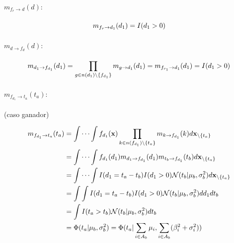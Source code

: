 \documentclass[11pt,twoside,spanish]{report} %
\begin{document}
\paragraph{$m_{f_{r}\rightarrow d}(d):$}

\begin{equation}
	\centering
	m_{f_{r}\rightarrow d_1}(d_1) = I(d_1>0)
\end{equation}

\paragraph{$m_{d\rightarrow f_{d}}(d):$}

\begin{equation}
	\centering
	m_{d_1\rightarrow f_{d_1}}(d_1) = \prod_{g\in n(d_1)\backslash\{f_{d_1}\}} m_{g\rightarrow d_1}(d_1)
	= m_{f_{r_1}\rightarrow d_1}(d_1)
	=  I(d_1>0)
\end{equation}

\paragraph{$m_{f_{d_1}\rightarrow t_a}(t_a):$} (caso ganador)

\begin{equation}
	\centering
	\begin{split}
		m_{f_{d_1}\rightarrow t_a}(t_a) & = \int\cdots\int f_{d_1}(\textbf{x})\prod_{k\in n(f_{d_1})\backslash\{t_a\}} m_{k\rightarrow f_{d_1}}(k)d\textbf{x}_{\backslash \{t_a\}} \\
		& = \int\cdots\int f_{d_1}(d_1)m_{d_1\rightarrow f_{d_1}}(d_1)m_{t_b\rightarrow f_{d_1}}(t_b)d\textbf{x}_{\backslash\{t_a\}}\\
		& = \int\cdots\int I(d_1=t_a-t_b)I(d_1>0)\mathcal{N}(t_b \vert \mu_b,\sigma_b^2)d\textbf{x}_{\backslash\{t_a\}}\\
		& =\int\int  I(d_1=t_a-t_b)I(d_1>0)\mathcal{N}(t_b \vert \mu_b,\sigma_b^2)dd_1dt_b\\
		& =\int I(t_a>t_b)\mathcal{N}(t_b \vert \mu_b,\sigma_b^2)dt_b\\
		& = \Phi(t_a \vert \mu_b,\sigma_b^2)=  \Phi(t_a \vert \sum_{i\in A_b}\mu_i,\sum_{i\in A_b}(\beta_i^2+\sigma_i^2))
	\end{split}
\end{equation}
\end{document}
